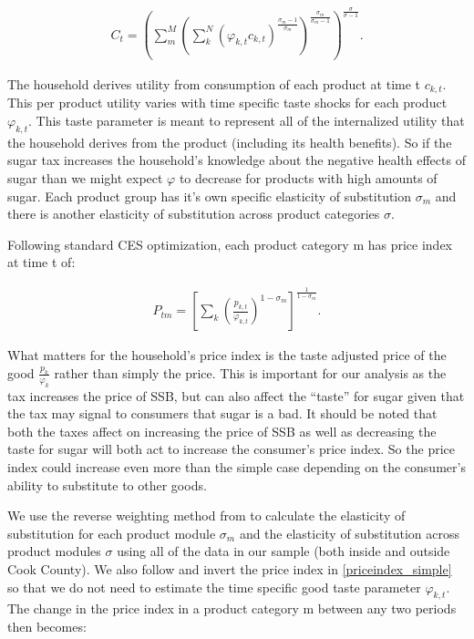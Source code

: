 \documentclass[12pt]{article}
\begin{document}
\begin{align}
	C_t = \left( \sum_m^M \left( \sum_k^N (\varphi_{k,t} c_{k,t})^{\frac{\sigma_m-1}{\sigma_m}}\right)^{\frac{\sigma_m}{\sigma_m-1}} \right)^{\frac{\sigma}{\sigma-1}}.
\end{align}

The household derives utility from consumption of each product at time t $c_{k,t}$. This per product utility varies with time specific taste shocks for each product $\varphi_{k,t}$. This taste parameter is meant to represent all of the internalized utility that the household derives from the product (including its health benefits). So if the sugar tax increases the household's knowledge about the negative health effects of sugar than we might expect $\varphi$ to decrease for products with high amounts of sugar. Each product group has it's own specific elasticity of substitution $\sigma_m$ and there is another elasticity of substitution across product categories $\sigma$.

Following standard CES optimization, each product category m has price index at time t of:

\begin{align}
P_{tm} = \left[ \sum_k \left( \frac{p_{k,t}}{\varphi_{k,t}}\right)^{1-\sigma_m}\right]^{\frac{1}{1-\sigma_m}}. \label{priceindex_simple}
\end{align}

What matters for the household's price index is the taste adjusted price of the good $\frac{p_k}{\varphi_k}$ rather than simply the price. This is important for our analysis as the tax increases the price of SSB, but can also affect the ``taste'' for sugar given that the tax may signal to consumers that sugar is a bad. It should be noted that both the taxes affect on increasing the price of SSB as well as decreasing the taste for sugar will both act to increase the consumer's price index. So the price index could increase even more than the simple case depending on the consumer's ability to substitute to other goods.

We use the reverse weighting method from \textcite{redding2020measuring} to calculate the elasticity of substitution for each product module $\sigma_m$ and the elasticity of substitution across product modules $\sigma$ using all of the data in our sample (both inside and outside Cook County). We also follow \textcite{redding2020measuring} and invert the price index in \eqref{priceindex_simple} so that we do not need to estimate the time specific good taste parameter $\varphi_{k,t}$. The change in the price index in a product category m between any two periods then becomes:
\end{document}
